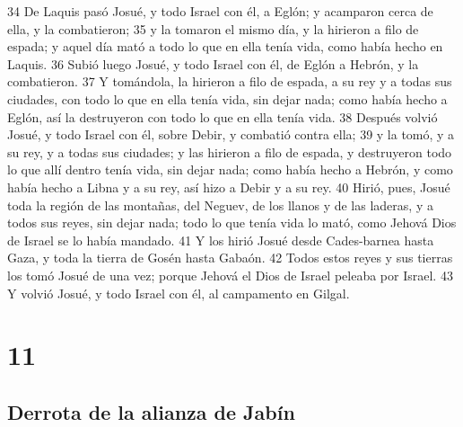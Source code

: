 34 De Laquis pasó Josué, y todo Israel con él, a Eglón; y acamparon cerca de ella, y la combatieron;
35 y la tomaron el mismo día, y la hirieron a filo de espada; y aquel día mató a todo lo que en ella tenía vida, como había hecho en Laquis.
36 Subió luego Josué, y todo Israel con él, de Eglón a Hebrón, y la combatieron.
37 Y tomándola, la hirieron a filo de espada, a su rey y a todas sus ciudades, con todo lo que en ella tenía vida, sin dejar nada; como había hecho a Eglón, así la destruyeron con todo lo que en ella tenía vida.
38 Después volvió Josué, y todo Israel con él, sobre Debir, y combatió contra ella;
39 y la tomó, y a su rey, y a todas sus ciudades; y las hirieron a filo de espada, y destruyeron todo lo que allí dentro tenía vida, sin dejar nada; como había hecho a Hebrón, y como había hecho a Libna y a su rey, así hizo a Debir y a su rey.
40 Hirió, pues, Josué toda la región de las montañas, del Neguev, de los llanos y de las laderas, y a todos sus reyes, sin dejar nada; todo lo que tenía vida lo mató, como Jehová Dios de Israel se lo había mandado.
41 Y los hirió Josué desde Cades-barnea hasta Gaza, y toda la tierra de Gosén hasta Gabaón.
42 Todos estos reyes y sus tierras los tomó Josué de una vez; porque Jehová el Dios de Israel peleaba por Israel.
43 Y volvió Josué, y todo Israel con él, al campamento en Gilgal.

\chapter{11}

\section*{Derrota de la alianza de Jabín}

